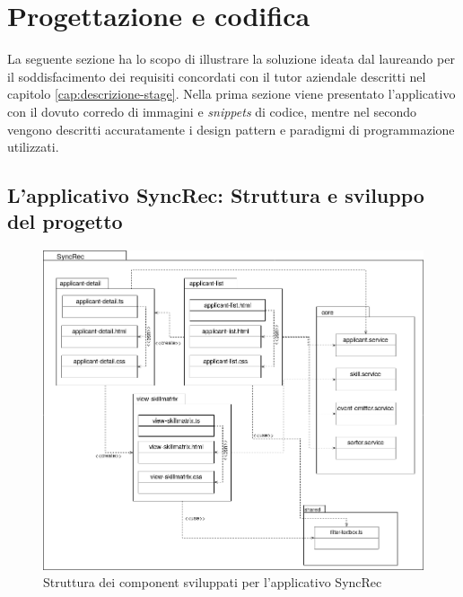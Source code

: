 
\chapter{Progettazione e codifica}
\label{cap:progettazione-codifica}

La seguente sezione ha lo scopo di illustrare la soluzione ideata dal laureando per il soddisfacimento dei requisiti concordati con il tutor aziendale descritti nel capitolo \ref{cap:descrizione-stage}. Nella prima sezione viene presentato l'applicativo con il dovuto corredo di immagini e \textit{snippets} di codice,  mentre nel secondo vengono descritti accuratamente i design pattern e paradigmi di programmazione utilizzati.


\section{L'applicativo SyncRec: Struttura e sviluppo del progetto}

\begin{figure}[!h] 
	\centering 
	\includegraphics[width=1\columnwidth]{immagini/usecase/UML1} 
	\caption{Struttura dei component sviluppati per l'applicativo SyncRec}
	\label{figura:UML1}
\end{figure}


